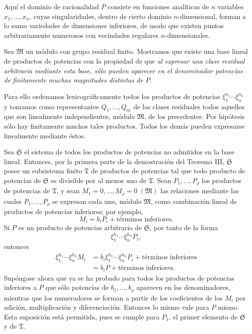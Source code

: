 \documentclass[11pt]{article}
\begin{document}
Aquí el dominio de racionalidad $P$ consiste en funciones analíticas de $n$ variables $x_1,\ldots,x_n$, cuyas singularidades, dentro de cierto dominio $n$-dimensional, forman a lo sumo variedades de dimensiones inferiores, de modo que existen puntos arbitrariamente numerosos con vecindades regulares $n$-dimensionales.

Sea $\mathfrak M$ un módulo con grupo residual finito. Mostramos que existe una base lineal de productos de potencias con la propiedad de que \emph{al expresar una clase residual arbitraria mediante esta base, sólo pueden aparecer en el denominador potencias de finitamente muchas magnitudes distintas de $P$}.

Para ello ordenamos lexicográficamente todos los productos de potencias $\xi_1^{a_1}\cdots\xi_n^{a_n}$ y tomamos como representantes $Q_1,\ldots,Q_m$ de las clases residuales todos aquellos que son linealmente independientes, módulo $\mathfrak M$, de los precedentes. Por hipótesis sólo hay finitamente muchos tales productos. Todos los demás pueden expresarse linealmente mediante éstos.

Sea $\mathfrak S$ el sistema de todos los productos de potencias no admitidos en la base lineal. Entonces, por la primera parte de la demostración del Teorema III, $\mathfrak S$ posee un subsistema finito $\mathfrak T$ de productos de potencias tal que todo producto de potencias de $\mathfrak S$ es divisible por al menos uno de $\mathfrak T$. Sean $P_1,\ldots,P_\rho$ los productos de potencias de $\mathfrak T$, y sean $M_1=0,\ldots,M_\rho=0\;(\mathfrak M)$ las relaciones mediante las cuales $P_1,\ldots,P_\rho$ se expresan cada uno, módulo $\mathfrak M$, como combinación lineal de productos de potencias inferiores; por ejemplo,
\[
 M_i=b_iP_i+\text{términos inferiores}.
\]
Si $P$ es un producto de potencias arbitrario de $\mathfrak S$, por tanto de la forma
\[
 \xi_1^{h_1}\cdots\xi_n^{h_n}P_i,
\]
entonces
\[
\begin{aligned}
 \xi_1^{h_1}\cdots\xi_n^{h_n}M_i
 &=b_i\xi_1^{h_1}\cdots\xi_n^{h_n}P_i+\text{términos inferiores}\\
 &=b_iP+\text{términos inferiores}.
\end{aligned}
\]
Supóngase ahora que ya se ha probado para todos los productos de potencias inferiores a $P$ que sólo potencias de $b_1,\ldots,b_\rho$ aparecen en los denominadores, mientras que los numeradores se forman a partir de los coeficientes de los $M_i$ por adición, multiplicación y diferenciación. Entonces lo mismo vale para $P$ mismo. Esta suposición está permitida, pues se cumple para $P_1$, el primer elemento de $\mathfrak S$ y de $\mathfrak T$.
\end{document}
